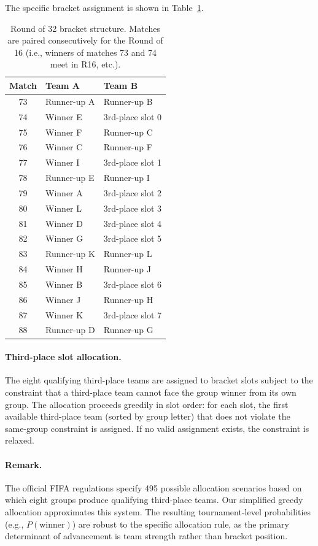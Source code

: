 \documentclass[11pt]{article}
\begin{document}
The specific bracket assignment is shown in Table~\ref{tab:r32}.

\begin{table}[h]
\centering
\small
\begin{tabular}{@{}cll@{}}
\toprule
Match & Team A & Team B \\
\midrule
73 & Runner-up A & Runner-up B \\
74 & Winner E & 3rd-place slot 0 \\
75 & Winner F & Runner-up C \\
76 & Winner C & Runner-up F \\
77 & Winner I & 3rd-place slot 1 \\
78 & Runner-up E & Runner-up I \\
79 & Winner A & 3rd-place slot 2 \\
80 & Winner L & 3rd-place slot 3 \\
81 & Winner D & 3rd-place slot 4 \\
82 & Winner G & 3rd-place slot 5 \\
83 & Runner-up K & Runner-up L \\
84 & Winner H & Runner-up J \\
85 & Winner B & 3rd-place slot 6 \\
86 & Winner J & Runner-up H \\
87 & Winner K & 3rd-place slot 7 \\
88 & Runner-up D & Runner-up G \\
\bottomrule
\end{tabular}
\caption{Round of 32 bracket structure. Matches are paired consecutively for the Round of 16 (i.e., winners of matches 73 and 74 meet in R16, etc.).}
\label{tab:r32}
\end{table}

\paragraph{Third-place slot allocation.} The eight qualifying third-place teams are assigned to bracket slots subject to the constraint that a third-place team cannot face the group winner from its own group. The allocation proceeds greedily in slot order: for each slot, the first available third-place team (sorted by group letter) that does not violate the same-group constraint is assigned. If no valid assignment exists, the constraint is relaxed.

\paragraph{Remark.} The official FIFA regulations specify 495 possible allocation scenarios based on which eight groups produce qualifying third-place teams. Our simplified greedy allocation approximates this system. The resulting tournament-level probabilities (e.g., $P(\text{winner})$) are robust to the specific allocation rule, as the primary determinant of advancement is team strength rather than bracket position.
\end{document}
